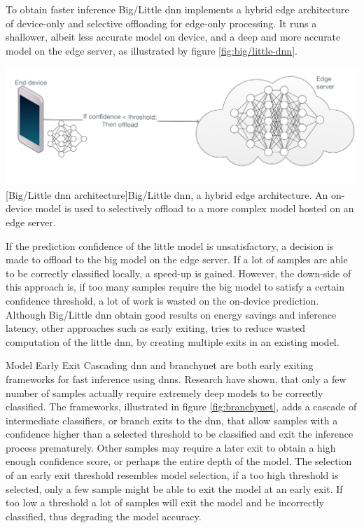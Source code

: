 \begin{enumdescript}
	To obtain faster inference Big/Little \gls{dnn} \cite{park_big/little_2015} implements a hybrid edge architecture of device-only and selective offloading for edge-only processing. It runs a shallower, albeit less accurate model on device, and a deep and more accurate model on the edge server, as illustrated by figure \ref{fig:big/little-dnn}. 
	
	\begin{minipage}[t]{\linewidth}                              
		\includegraphics[width=\linewidth]{figures/models/big_little_dnn}
		[Big/Little \gls{dnn} architecture]{Big/Little \gls{dnn}, a hybrid edge architecture. An on-device model is used to selectively offload to a more complex model hosted on an edge server.}
		\label{fig:big/little-dnn}
	\end{minipage}
	
	If the prediction confidence of the little model is unsatisfactory, a decision is made to offload to the big model on the edge server. If a lot of samples are able to be correctly classified locally, a speed-up is gained. However, the down-side of this approach is, if too many samples require the big model to satisfy a certain confidence threshold, a lot of work is wasted on the on-device prediction. Although Big/Little \gls{dnn} obtain good results on energy savings and inference latency, other approaches such as early exiting, tries to reduce wasted computation of the little \gls{dnn}, by creating multiple exits in an existing model.
	
	\item[Model Early Exit] Cascading \gls{dnn} \cite{leroux_resource-constrained_2015} and \gls{branchynet} \cite{teerapittayanon_branchynet:_2016} are both early exiting frameworks for fast inference using \gls{dnn}s. Research have shown, that only a few number of samples actually require extremely deep models to be correctly classified. The frameworks, illustrated in figure \ref{fig:branchynet}, adds a cascade of intermediate classifiers, or branch exits to the \gls{dnn}, that allow samples with a confidence higher than a selected threshold to be classified and exit the inference process prematurely. Other samples may require a later exit to obtain a high enough confidence score, or perhaps the entire depth of the model. The selection of an early exit threshold resembles model selection, if a too high threshold is selected, only a few sample might be able to exit the model at an early exit. If too low a threshold a lot of samples will exit the model and be incorrectly classified, thus degrading the model accuracy. 


\end{enumdescript}
